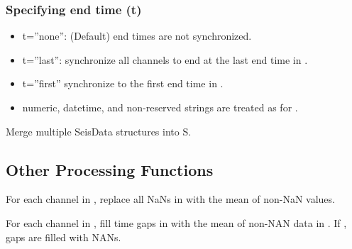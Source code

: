 \documentclass[letterpaper,11pt,english]{sphinxmanual}
\begin{document}
\subsubsection{Specifying end time (t)}
\label{\detokenize{src/Processing/processing:specifying-end-time-t}}\begin{itemize}
\item {} 
t=”none”: (Default) end times are not synchronized.

\item {} 
t=”last”: synchronize all channels to end at the last end time in .

\item {} 
t=”first” synchronize to the first end time in .

\item {} 
numeric, datetime, and non-reserved strings are treated as for .

\end{itemize}


\begin{fulllineitems}
\end{fulllineitems}


Merge multiple SeisData structures into S.


\subsection{Other Processing Functions}
\label{\detokenize{src/Processing/processing:other-processing-functions}}

\begin{fulllineitems}
\end{fulllineitems}


For each channel  in , replace all NaNs in  with the mean
of non-NaN values.


\begin{fulllineitems}
\end{fulllineitems}


For each channel  in , fill time gaps in  with the mean of
non-NAN data in . If , gaps are filled with NANs.
\end{document}
